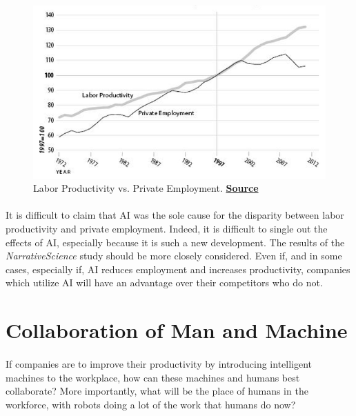 \documentclass{article}
\begin{document}
      \begin{figure}[ht]
        \centering
        \includegraphics[width=\textwidth,height=\textheight, keepaspectratio]{Figure2}
        \caption{Labor Productivity vs. Private Employment.
                 \href{http://www.techrepublic.com/article/ai-is-destroying-more-jobs-than-it-creates-what-it-means-and-how-we-can-stop-it/}
                 {\textbf{Source}}}
      \end{figure}

    \paragraph{}
      It is difficult to claim that AI was
      the sole cause for the disparity between labor productivity and private
      employment. Indeed, it is difficult to single out the effects of AI,
      especially because it is such a new development. The results of the
      \textit{NarrativeScience} study should be more closely considered.
      Even if, and in some cases, especially if, AI reduces employment and
      increases productivity, companies which utilize AI will have an advantage
      over their competitors who do not.

  \section{Collaboration of Man and Machine}

    \paragraph{}
      If companies are to improve their productivity by introducing intelligent
      machines to the workplace, how can these machines
       and humans best collaborate? More importantly, what will be the place
      of humans in the workforce, with robots doing a lot of the work that humans
      do now?
\end{document}
